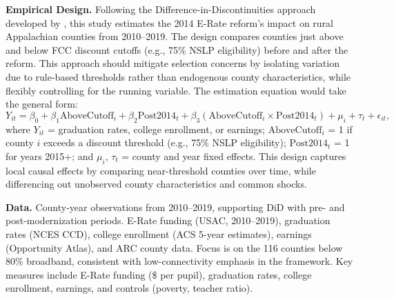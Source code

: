\textbf{Empirical Design.} Following the Difference-in-Discontinuities approach developed by \cite{grembiFiscalRulesMatter2016}, this study estimates the 2014 E-Rate reform’s impact on rural Appalachian counties from 2010–2019. The design compares counties just above and below FCC discount cutoffs (e.g., 75\% NSLP eligibility) before and after the reform. This approach should mitigate selection concerns by isolating variation due to rule-based thresholds rather than endogenous county characteristics, while flexibly controlling for the running variable. The estimation equation would take the general form:
\[Y_{it} = \beta_0 + \beta_1 \text{AboveCutoff}_i + \beta_2 \text{Post2014}_t + \beta_3 (\text{AboveCutoff}_i \times \text{Post2014}_t)  + \mu_i + \tau_t + \epsilon_{it},\]
where $Y_{it}$ = graduation rates, college enrollment, or earnings; $\text{AboveCutoff}_i$ = 1 if county $i$ exceeds a discount threshold (e.g., 75\% NSLP eligibility); $\text{Post2014}_t$ = 1 for years 2015+; and $\mu_i$, $\tau_t$ = county and year fixed effects. This design captures local causal effects by comparing near-threshold counties over time, while differencing out unobserved county characteristics and common shocks. 

\textbf{Data.} County-year observations from 2010–2019, supporting DiD with pre- and post-modernization periods. E-Rate funding (USAC, 2010–2019), graduation rates (NCES CCD), college enrollment (ACS 5-year estimates), earnings (Opportunity Atlas), and ARC county data. Focus is on the 116 counties below 80\% broadband, consistent with low-connectivity emphasis in the framework. Key measures include E-Rate funding (\$ per pupil), graduation rates, college enrollment, earnings, and controls (poverty, teacher ratio).





